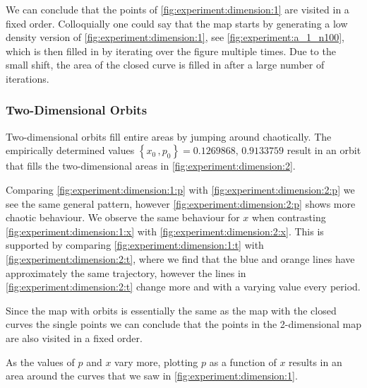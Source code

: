 We can conclude that the points of \cref{fig:experiment:dimension:1} are visited in a fixed order. Colloquially one could say that the map starts by generating a low density version of \cref{fig:experiment:dimension:1}, see \cref{fig:experiment:a_1_n100}, which is then filled in by iterating over the figure multiple times. Due to the small shift, the area of the closed curve is filled in after a large number of iterations.

\subsubsection{Two-Dimensional Orbits}	
\label{sss:experiment:a:2D}
	Two-dimensional orbits fill entire areas by jumping around chaotically. The empirically determined values $\left\{x_0\,, p_0 \right\} = {\num{0.1269868},\,\num{0.9133759}}$ result in an orbit that fills the two-dimensional areas in \cref{fig:experiment:dimension:2}. 

	Comparing \cref{fig:experiment:dimension:1:p} with \cref{fig:experiment:dimension:2:p} we see the same general pattern, however \cref{fig:experiment:dimension:2:p} shows more chaotic behaviour. We observe the same behaviour for $x$ when contrasting \cref{fig:experiment:dimension:1:x} with \cref{fig:experiment:dimension:2:x}. This is supported by comparing \cref{fig:experiment:dimension:1:t} with \cref{fig:experiment:dimension:2:t}, where we find that the blue and orange lines have approximately the same trajectory, however the lines in \cref{fig:experiment:dimension:2:t} change more and with a varying value every period.

	Since the map with orbits is essentially the same as the map with the closed curves the single points we can conclude that the points in the 2-dimensional map are also visited in a fixed order.

	As the values of $p$ and $x$ vary more, plotting $p$ as a function of $x$ results in an area around the curves that we saw in \cref{fig:experiment:dimension:1}.
